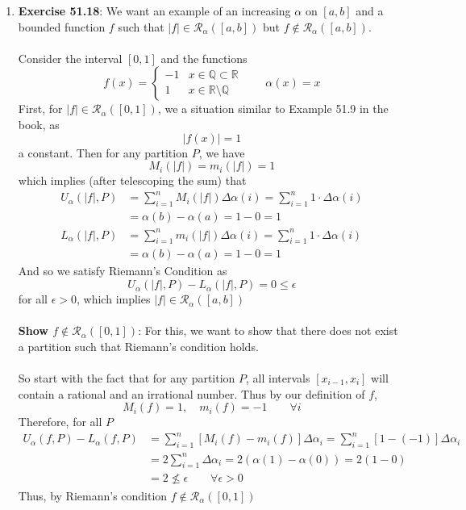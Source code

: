 \documentclass[12pt]{article}
\theoremstyle{plain}
\theoremstyle{definition}
\theoremstyle{remark}
\begin{document}
\begin{enumerate}
\newpage
\item \textbf{Exercise 51.18}: We want an example of an increasing
    $\alpha$ on $[a,b]$ and a bounded function $f$ such that
    $|f| \in \mathscr{R}_\alpha([a,b])$ but 
    $f \not\in \mathscr{R}_\alpha([a,b])$. 
    \\
    \\
    Consider the interval $[0,1]$ and the functions
    \begin{equation}
        f(x) = 
            \begin{cases} 
                -1 & x \in \mathbb{Q} \subset \mathbb{R} \\
                1 &  x \in \mathbb{R} \setminus \mathbb{Q}
            \end{cases} 
        \qquad 
        \alpha(x) = x
    \end{equation}
    First, for $|f| \in \mathscr{R}_\alpha([0,1])$, we
    a situation similar to Example 51.9 in the book, as 
        \[ |f(x)| = 1 \]
    a constant. Then for any partition $P$, we have
        \[ M_i(|f|) = m_i(|f|) = 1 \]
    which implies (after telescoping the sum) that 
    \begin{align*}
        U_\alpha(|f|, P) &= \sum^n_{i=1} M_i(|f|) \Delta\alpha(i)  =
            \sum^n_{i=1} 1\cdot \Delta\alpha(i) \\
            &= \alpha(b) -\alpha(a) = 1 - 0 = 1\\
        L_\alpha(|f|, P) &= \sum^n_{i=1} m_i(|f|) \Delta\alpha(i) =
            \sum^n_{i=1} 1\cdot \Delta\alpha(i) \\
            &= \alpha(b) -\alpha(a) = 1 - 0  = 1
    \end{align*}
    And so we satisfy Riemann's Condition as
        \[ U_\alpha(|f|, P) - L_\alpha(|f|, P) = 0 \leq \epsilon \]
    for all $\epsilon>0$, which implies $|f| \in \mathscr{R}_\alpha([a,b])$
    \\
    \\
    \textbf{Show $f\not\in \mathscr{R}_\alpha([0,1])$}: For this, we want
    to show that there does not exist a partition such that Riemann's
    condition holds. 
    \\
    \\
    So start with the fact that for any partition $P$, all
    intervals $[x_{i-1}, x_i]$  
    will contain a rational and an irrational number. Thus
    by our definition of $f$, 
        \[ M_i(f) = 1, \quad m_i(f) = -1 \qquad \forall i \]
    Therefore, for all $P$
    \begin{align*}
        U_\alpha(f,P) - L_\alpha(f,P) &= 
            \sum^n_{i=1} [M_i(f) - m_i(f)] \Delta\alpha_i =
            \sum^n_{i=1} [1 - (-1)] \Delta\alpha_i \\
        &= 2 \sum^n_{i=1} \Delta\alpha_i = 
            2(\alpha(1) - \alpha(0)) = 2 (1-0)\\
        &= 2 \not\leq \epsilon \qquad \forall \epsilon > 0
    \end{align*}
    Thus, by Riemann's condition $f \not\in 
    \mathscr{R}_\alpha([0,1])$


\end{enumerate}
\end{document}
